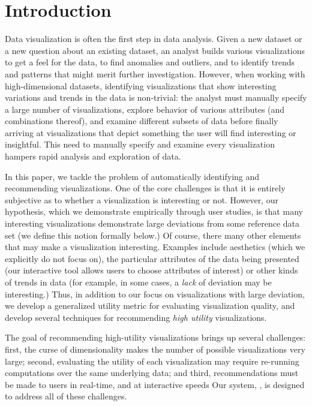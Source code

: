 
\section{Introduction}
\label{sec:introduction}
Data visualization is often the first step in data analysis.
Given a new dataset or a new question about an existing dataset, an analyst builds
various visualizations to get a feel for the data, to find anomalies and outliers, 
and to identify trends and patterns that might merit further investigation. 
However, when working with high-dimensional datasets, identifying visualizations that
show interesting variations and trends in the data is non-trivial:
the analyst must manually specify a large number of visualizations, explore behavior of various
attributes (and combinations thereof), and examine different subsets of data before finally 
arriving at visualizations that depict something the user will find interesting or insightful.
This need to manually specify and examine every visualization hampers rapid analysis 
and exploration of data.

In this paper, we tackle the problem of automatically identifying and recommending 
visualizations.  One of the core challenges is that it is entirely subjective as to
whether a visualization is interesting or not.  
  However, our hypothesis, which we demonstrate
empirically through user studies, is that many interesting visualizations 
demonstrate large deviations from some reference data set (we define this notion formally below.)
Of course, there many other elements that may make a visualization interesting.
Examples include aesthetics (which we explicitly do not focus on), the particular attributes of the data being
presented (our interactive tool allows users to choose attributes of interest) or other kinds of trends in
data (for example, in some cases, a {\it lack} of deviation may be interesting.)  Thus,
in addition to our focus on visualizations with large deviation, we develop a generalized
utility metric for evaluating visualization quality, and develop several
techniques for recommending {\it high utility} visualizations.

The goal of recommending high-utility visualizations brings up several challenges: first,
the curse of dimensionality makes the number of possible visualizations very large;
second, evaluating the utility of each visualization may require re-running computations over the 
same underlying data; 
and third, recommendations must be made to users in real-time, and at interactive speeds 
Our system, \SeeDB, is designed to address all of these challenges.

